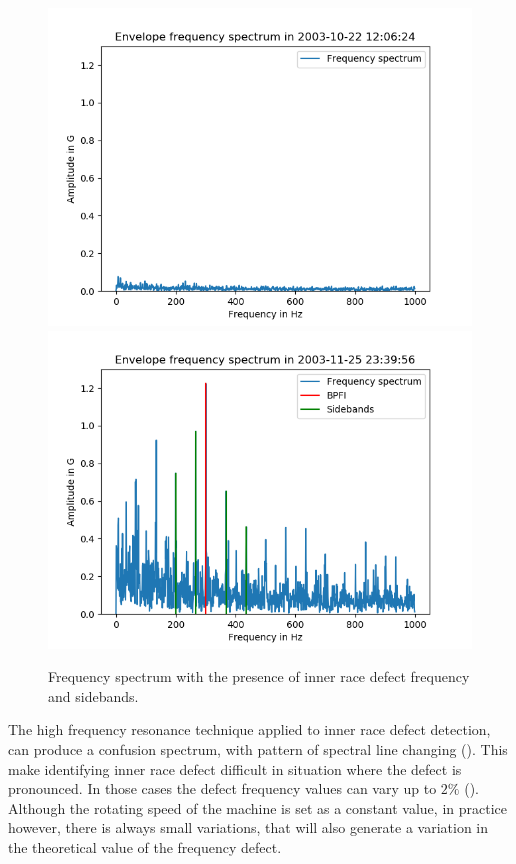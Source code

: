 \documentclass[../Main/thesis.tex]{subfiles}
\begin{document}
\begin{figure}[H]
	\centering
	\includegraphics[width=0.7\linewidth]{../fig/bpfi/first_day_spectrum}
	\includegraphics[width=0.7\linewidth]{../fig/bpfi/bpfi_sidebands}
	\caption{Frequency spectrum with the presence of inner race defect frequency and sidebands.}
	\label{fig:bpfi}
\end{figure}
\justify
The high frequency resonance technique applied to inner race defect detection, can produce a confusion spectrum, with pattern of spectral line changing (\cite{mcfadden1984a}). This make identifying inner race defect difficult in situation where the defect is pronounced. In those cases the defect frequency values can vary up to $2\%$ (\cite{randal2010}). Although the rotating speed of the machine is set as a constant value, in practice however, there is always small variations, that will also generate a variation in the theoretical value of the frequency defect.


\clearpage
\end{document}
